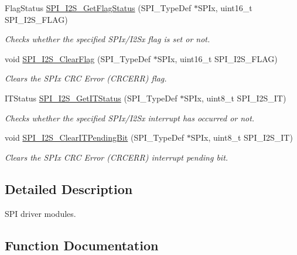 \begin{DoxyCompactItemize}
Flag\+Status \mbox{\hyperlink{group___s_p_i_ga1bd785d129e09c5734a876c8f2767204}{S\+P\+I\+\_\+\+I2\+S\+\_\+\+Get\+Flag\+Status}} (S\+P\+I\+\_\+\+Type\+Def $\ast$S\+P\+Ix, uint16\+\_\+t S\+P\+I\+\_\+\+I2\+S\+\_\+\+F\+L\+AG)
\begin{DoxyCompactList}\small\item\em Checks whether the specified S\+P\+Ix/\+I2\+Sx flag is set or not. \end{DoxyCompactList}\item 
void \mbox{\hyperlink{group___s_p_i_ga3aabd9e2437e213056c0ed9bdfa1a724}{S\+P\+I\+\_\+\+I2\+S\+\_\+\+Clear\+Flag}} (S\+P\+I\+\_\+\+Type\+Def $\ast$S\+P\+Ix, uint16\+\_\+t S\+P\+I\+\_\+\+I2\+S\+\_\+\+F\+L\+AG)
\begin{DoxyCompactList}\small\item\em Clears the S\+P\+Ix C\+RC Error (C\+R\+C\+E\+RR) flag. \end{DoxyCompactList}\item 
I\+T\+Status \mbox{\hyperlink{group___s_p_i_ga72decbc1cd79f8fad92a2204beca6bc5}{S\+P\+I\+\_\+\+I2\+S\+\_\+\+Get\+I\+T\+Status}} (S\+P\+I\+\_\+\+Type\+Def $\ast$S\+P\+Ix, uint8\+\_\+t S\+P\+I\+\_\+\+I2\+S\+\_\+\+IT)
\begin{DoxyCompactList}\small\item\em Checks whether the specified S\+P\+Ix/\+I2\+Sx interrupt has occurred or not. \end{DoxyCompactList}\item 
void \mbox{\hyperlink{group___s_p_i_ga35a524a49ff3d058137060f751e8749f}{S\+P\+I\+\_\+\+I2\+S\+\_\+\+Clear\+I\+T\+Pending\+Bit}} (S\+P\+I\+\_\+\+Type\+Def $\ast$S\+P\+Ix, uint8\+\_\+t S\+P\+I\+\_\+\+I2\+S\+\_\+\+IT)
\begin{DoxyCompactList}\small\item\em Clears the S\+P\+Ix C\+RC Error (C\+R\+C\+E\+RR) interrupt pending bit. \end{DoxyCompactList}\end{DoxyCompactItemize}


\subsection{Detailed Description}
S\+PI driver modules. 



\subsection{Function Documentation}
\mbox{\label{group___s_p_i_gafe061c71bbc5b4224f3f2884dc53739e}} 
